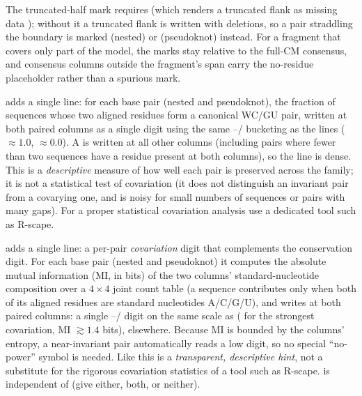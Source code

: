 \begin{sreitems}{}
  The  truncated-half mark requires  (which renders a
  truncated flank as missing data \otext{\~{}}); without it a truncated flank is
  written with deletions, so a pair straddling the boundary is marked 
  (nested) or  (pseudoknot) instead. For a fragment that covers only
  part of the model, the marks stay relative to the full-CM consensus, and
  consensus columns outside the fragment's span carry the \otext{-} no-residue
  placeholder rather than a spurious mark.
\item[\emprog{--bpcons}]
  adds a single  line: for each base pair (nested and
  pseudoknot), the fraction of sequences whose two aligned residues form a
  canonical WC/GU pair, written at both paired columns as a single digit using
  the same --/\otext{*} bucketing as the  lines
  (\otext{*} $\approx 1.0$,  $\approx 0.0$). A  is written at all
  other columns (including pairs where fewer than two sequences have a residue
  present at both columns), so the line is dense. This is a \emph{descriptive}
  measure of how well each pair is preserved across the family; it is not a
  statistical test of covariation (it does not distinguish an invariant pair from
  a covarying one, and is noisy for small numbers of sequences or pairs with many
  gaps). For a proper statistical covariation analysis use a dedicated tool such
  as R-scape.
\item[\emprog{--bpcov}]
  adds a single  line: a per-pair \emph{covariation} digit
  that complements the  conservation digit. For each base pair
  (nested and pseudoknot) it computes the absolute mutual information (MI, in
  bits) of the two columns' standard-nucleotide composition over a $4\times4$
  joint count table (a sequence contributes only when both of its aligned
  residues are standard nucleotides A/C/G/U), and writes
   at both paired columns: a single
  --/\otext{*} digit on the same scale as 
  (\otext{*} for the strongest covariation, MI $\gtrsim 1.4$ bits), 
  elsewhere. Because MI is bounded by the columns' entropy, a near-invariant pair
  automatically reads a low digit, so no special ``no-power'' symbol is needed.
  Like  this is a \emph{transparent, descriptive hint}, not a
  substitute for the rigorous covariation statistics of a tool such as R-scape.
   is independent of  (give either, both, or
  neither).
\end{sreitems}

